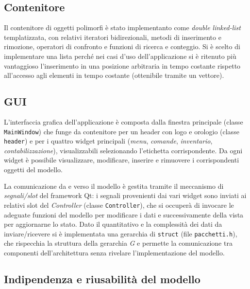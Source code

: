 \documentclass[
  10pt,
]{article}
\begin{document}
\hypertarget{contenitore}{%
\subsection{Contenitore}\label{contenitore}}

Il contenitore di oggetti polimorfi è stato implementanto come
\emph{double linked-list} templatizzata, con relativi iteratori
bidirezionali, metodi di inserimento e rimozione, operatori di confronto
e funzioni di ricerca e conteggio. Si è scelto di implementare una lista
perché nei casi d'uso dell'applicazione si è ritenuto più vantaggioso
l'inserimento in una posizione arbitraria in tempo costante rispetto
all'accesso agli elementi in tempo costante (ottenibile tramite un
vettore).

\hypertarget{gui}{%
\subsection{GUI}\label{gui}}

L'interfaccia grafica dell'applicazione è composta dalla finestra
principale (classe \texttt{MainWindow}) che funge da contenitore per un
header con logo e orologio (classe \texttt{header}) e per i quattro
widget principali (\emph{menu}, \emph{comande}, \emph{inventario},
\emph{contabilizzazione}), visualizzabili selezionando l'etichetta
corrispondente. Da ogni widget è possibile visualizzare, modificare,
inserire e rimuovere i corrispondenti oggetti del modello.

La comunicazione da e verso il modello è gestita tramite il meccanismo
di \emph{segnali/slot} del framework Qt: i segnali provenienti dai vari
widget sono inviati ai relativi slot del \emph{Controller} (classe
\texttt{Controller}), che si occuperà di invocare le adeguate funzioni
del modello per modificare i dati e successivamente della vista per
aggiornarne lo stato. Dato il quantitativo e la complessità dei dati da
inviare/ricevere si è implementata una gerarchia di \texttt{struct}
(file \texttt{pacchetti.h}), che rispecchia la struttura della gerarchia
\emph{G} e permette la comunicazione tra componenti dell'architettura
senza rivelare l'implementazione del modello.

\hypertarget{indipendenza-e-riusabilituxe0-del-modello}{%
\subsection{Indipendenza e riusabilità del
modello}\label{indipendenza-e-riusabilituxe0-del-modello}}
\end{document}
